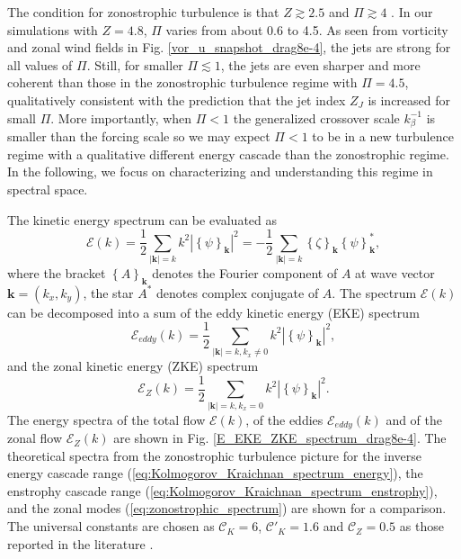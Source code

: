 \documentclass{ametsoc}
\begin{document}
The condition for zonostrophic turbulence is that $Z\apprge2.5$ and $\Pi\apprge4$
\citep{Sukoriansky2007,Galperin2010}. In our simulations with $Z=4.8$,
$\Pi$ varies from about 0.6 to 4.5. As seen from vorticity and zonal
wind fields in Fig. \ref{vor_u_snapshot_drag8e-4}, the jets are
strong for all values of $\Pi$. Still, for smaller $\Pi\apprle 1$,
the jets are even sharper and more coherent than those in the zonostrophic turbulence
regime with $\Pi=4.5$, qualitatively consistent with the prediction
that the jet index $Z_{J}$ is increased for small $\Pi$. 
More importantly, when $\Pi<1$ the generalized crossover
scale $k_{\beta}^{-1}$ is smaller than the forcing scale so we may expect
$\Pi<1$ to be in a new turbulence regime with a qualitative different
energy cascade than the zonostrophic regime. In the following, we
focus on characterizing and understanding this regime in spectral space.

The kinetic energy spectrum can be evaluated as
\begin{equation}
\mathcal{E}(k)=\frac{1}{2}\underset{|\mathbf{k}|=k}{\sum}k^{2}|\left\{ \psi\right\} _{\mathbf{k}}|^{2}=-\frac{1}{2}\underset{|\mathbf{k}|=k}{\sum}\left\{ \zeta\right\} _{\mathbf{k}}\left\{ \psi\right\} _{\mathbf{k}}^{*},\label{eq:energy_spectrum_psi_zeta}
\end{equation}
where the bracket $\left\{ A\right\} _{\mathbf{k}}$ denotes the Fourier
component of $A$ at wave vector $\mathbf{k}=(k_{x},k_{y})$, the
star $A^{*}$ denotes complex conjugate of $A$. The spectrum $\mathcal{E}(k)$
can be decomposed into a sum of the eddy kinetic energy (EKE) spectrum
\begin{equation}
\mathcal{E}_{eddy}(k)=\frac{1}{2}\underset{|\mathbf{k}|=k,k_{x}\neq0}{\sum}k^{2}|\left\{ \psi\right\} _{\mathbf{k}}|^{2},\label{eq:EKE_spec_psi}
\end{equation}
and the zonal kinetic energy (ZKE) spectrum
\begin{equation}
\mathcal{E}_{Z}(k)=\frac{1}{2}\underset{|\mathbf{k}|=k,k_{x}=0}{\sum}k^{2}|\left\{ \psi\right\} _{\mathbf{k}}|^{2}.\label{eq:ZKE_spec_psi}
\end{equation}
The energy spectra of the total flow $\mathcal{E}(k)$, of the eddies
$\mathcal{E}_{eddy}(k)$ and of the zonal flow $\mathcal{E}_{Z}(k)$
are shown in Fig. \ref{E_EKE_ZKE_spectrum_drag8e-4}. The theoretical
spectra from the zonostrophic turbulence picture for the inverse energy 
cascade range (\ref{eq:Kolmogorov_Kraichnan_spectrum_energy}),
the enstrophy cascade range (\ref{eq:Kolmogorov_Kraichnan_spectrum_enstrophy}),
and the zonal modes (\ref{eq:zonostrophic_spectrum}) 
are shown for a comparison. The universal constants are chosen as
$\mathcal{C}_{K}=6$, $\mathcal{C'}_{K}=1.6$ and $\mathcal{C}_{Z}=0.5$
as those reported in the literature \citep{Boffetta2012,Galperin2010}.
\end{document}
